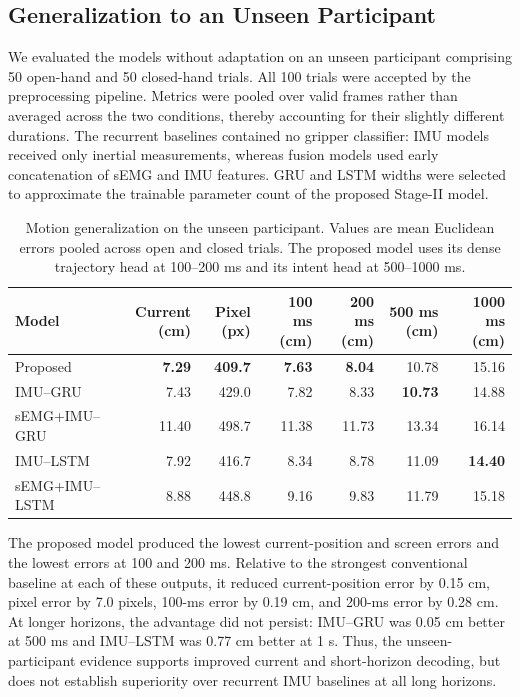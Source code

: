 \subsection{Generalization to an Unseen Participant}
\label{subsec:unseen-participant}

We evaluated the models without adaptation on an unseen participant comprising
50 open-hand and 50 closed-hand trials. All 100 trials were accepted by the
preprocessing pipeline. Metrics were pooled over valid frames rather than
averaged across the two conditions, thereby accounting for their slightly
different durations. The recurrent baselines contained no gripper classifier:
IMU models received only inertial measurements, whereas fusion models used
early concatenation of sEMG and IMU features. GRU and LSTM widths were selected
to approximate the trainable parameter count of the proposed Stage-II model.

\begin{table}[t]
 \centering
 \caption{Motion generalization on the unseen participant. Values are mean
 Euclidean errors pooled across open and closed trials. The proposed model uses
 its dense trajectory head at 100--200 ms and its intent head at 500--1000 ms.}
 \label{tab:unseen-motion}
 \small
 \setlength{\tabcolsep}{5pt}
 \begin{tabular}{lrrrrrr}
  \hline
  Model & Current (cm) & Pixel (px) & 100 ms (cm) & 200 ms (cm) &
  500 ms (cm) & 1000 ms (cm) \\
  \hline
  Proposed       & \textbf{7.29} & \textbf{409.7} & \textbf{7.63} &
                   \textbf{8.04} & 10.78 & 15.16 \\
  IMU--GRU       & 7.43 & 429.0 & 7.82 & 8.33 & \textbf{10.73} & 14.88 \\
  sEMG+IMU--GRU  & 11.40 & 498.7 & 11.38 & 11.73 & 13.34 & 16.14 \\
  IMU--LSTM      & 7.92 & 416.7 & 8.34 & 8.78 & 11.09 & \textbf{14.40} \\
  sEMG+IMU--LSTM & 8.88 & 448.8 & 9.16 & 9.83 & 11.79 & 15.18 \\
  \hline
 \end{tabular}
\end{table}

The proposed model produced the lowest current-position and screen errors and
the lowest errors at 100 and 200 ms. Relative to the strongest conventional
baseline at each of these outputs, it reduced current-position error by
0.15 cm, pixel error by 7.0 pixels, 100-ms error by 0.19 cm, and 200-ms error
by 0.28 cm. At longer horizons, the advantage did not persist: IMU--GRU was
0.05 cm better at 500 ms and IMU--LSTM was 0.77 cm better at 1 s. Thus, the
unseen-participant evidence supports improved current and short-horizon
decoding, but does not establish superiority over recurrent IMU baselines at
all long horizons.

